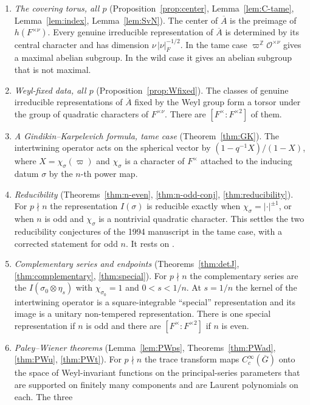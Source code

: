 \documentclass[12pt,letterpaper]{article}
\numberwithin{equation}{section}
\theoremstyle{definition}
\newcommand{\Z}{\mathbb Z}
\newcommand{\OF}{\mathcal O}
\newcommand{\vp}{\varpi}
\newcommand{\bG}{\overline{G}}
\newcommand{\bA}{\overline{A}}
\begin{document}
\begin{enumerate}[label=(\arabic*),leftmargin=*,itemsep=2pt]
\item \emph{The covering torus, all $p$} (Proposition~\ref{prop:center},
Lemma~\ref{lem:C-tame}, Lemma~\ref{lem:index}, Lemma~\ref{lem:SvN}).  The center of $\bA$
is the preimage of $h(F^{\times\nu})$.  Every genuine irreducible representation of $\bA$
is determined by its central character and has dimension $\nu\,|\nu|_F^{-1/2}$.  In the
tame case $\vp^{\Z}\OF^{\times\nu}$ gives a maximal abelian subgroup.  In the wild case it
gives an abelian subgroup that is not maximal.
\item \emph{Weyl-fixed data, all $p$} (Proposition~\ref{prop:Wfixed}).  The classes of
genuine irreducible representations of $\bA$ fixed by the Weyl group form a torsor under
the group of quadratic characters of $F^{\times\nu}$.  There are $[F^\times:F^{\times2}]$ of
them.
\item \emph{A Gindikin--Karpelevich formula, tame case} (Theorem~\ref{thm:GK}).  The
intertwining operator acts on the spherical vector by
$(1-q^{-1}X)/(1-X)$, where $X=\chi_\sigma(\vp)$ and $\chi_\sigma$ is a character of
$F^\times$ attached to the inducing datum $\sigma$ by the $n$-th power map.
\item \emph{Reducibility} (Theorems~\ref{thm:n-even}, \ref{thm:n-odd-conj},
\ref{thm:reducibility}).  For $p\nmid n$ the representation $I(\sigma)$ is reducible exactly
when $\chi_\sigma=|\cdot|^{\pm1}$, or when $n$ is odd and $\chi_\sigma$ is a nontrivial
quadratic character.  This settles the two reducibility conjectures of the 1994 manuscript
in the tame case, with a corrected statement for odd $n$.  It rests on \cite{GS16,He25}.
\item \emph{Complementary series and endpoints} (Theorems~\ref{thm:detJ},
\ref{thm:complementary}, \ref{thm:special}).  For $p\nmid n$ the complementary series are
the $I(\sigma_0\otimes\eta_s)$ with $\chi_{\sigma_0}=1$ and $0<s<1/n$.  At $s=1/n$ the
kernel of the intertwining operator is a square-integrable ``special'' representation
and its image is a unitary non-tempered representation.  There is one special
representation if $n$ is odd and there are $[F^\times:F^{\times2}]$ if $n$ is even.
\item \emph{Paley--Wiener theorems} (Lemma~\ref{lem:PWps}, Theorems~\ref{thm:PWad},
\ref{thm:PWu}, \ref{thm:PWt}).  For $p\nmid n$ the trace transform maps $C_c^\infty(\bG)$
onto the space of Weyl-invariant functions on the principal-series parameters that are
supported on finitely many components and are Laurent polynomials on each.  The three

\end{enumerate}
\end{document}
